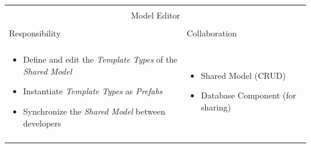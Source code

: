 \vspace{0.5cm} \noindent      
\begin{tabular}{|l|l|}
    \cline{1-2}
    \multicolumn{2}{|c|}{} \\[-0.3cm]
    \multicolumn{2}{|c|}{Model Editor} \\ 
    \multicolumn{2}{|c|}{} \\[-0.3cm]
    \cline{1-2}
    Responsibility & Collaboration \\
    \cline{1-2}
    & \\[-0.2cm]
    \begin{minipage}{0.47\textwidth}
        \begin{itemize}
          \item Define and edit the \textit{Template
          Types} of the \textit{Shared Model} 
          \item Instantiate \textit{Template Types} as \textit{Prefabs}
          \item Synchronize the \textit{Shared Model} between developers
        \end{itemize} 
    \end{minipage}
	&
    \begin{minipage}{0.47\textwidth}
        \begin{itemize}
          \item Shared Model (CRUD)
          \item Database Component (for sharing)
        \end{itemize} 
    \end{minipage}
	\\ & \\
    \hline
\end{tabular}

